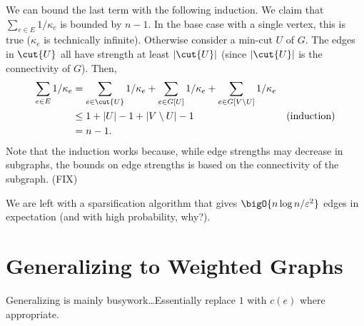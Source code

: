 \documentclass[12pt]{article}
\begin{document}
We can bound the last term with the following induction. We claim that
$\sum_{e \in E} 1/\kappa_e$ is bounded by $n - 1$. In the base case with a
single vertex, this is true ($\kappa_e$ is technically infinite). Otherwise
consider a min-cut $U$ of $G$. The edges in $\cut{U}$ all have strength at least
$\sizeof{\cut{U}}$ (since $\sizeof{\cut{U}}$ is the connectivity of $G$). Then,
\begin{align*}
  \sum_{e \in E}1/\kappa_e & = \sum_{e \in \cut{U}}1/\kappa_e + \sum_{e \in G[U]} 1/\kappa_e + \sum_{e \in G[V \setminus U]} 1/\kappa_e                      \\
                           & \leq 1 + \sizeof{U} - 1 + \sizeof{V \setminus U} - 1                                                       & \text{(induction)} \\
                           & = n - 1.
\end{align*}
Note that the induction works because, while edge strengths may decrease in
subgraphs, the bounds on edge strengths is based on the connectivity of the
subgraph. (FIX)

We are left with a sparsification algorithm that gives $\bigO{n \log n /
  \eps^2}$ edges in expectation (and with high probability, why?).

\section{Generalizing to Weighted Graphs}

Generalizing is mainly busywork\dots Essentially replace $1$ with $c(e)$ where
appropriate.
\printbibliography
\end{document}

